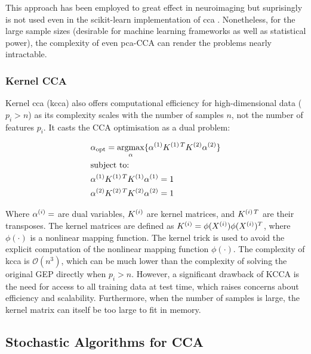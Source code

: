 This approach has been employed to great effect in neuroimaging but suprisingly is not used even in the scikit-learn implementation of \acrshort{cca} \citep{pedregosa2011scikit}.
Nonetheless, for the large sample sizes (desirable for machine learning frameworks as well as statistical power), the complexity of even \acrshort{pca}-CCA can render the problems nearly intractable.

\subsubsection{Kernel CCA}

Kernel \acrshort{cca} (\acrshort{kcca}) also offers computational efficiency for high-dimensional data (\(p_i>n\)) as its complexity scales with the number of samples \(n\), not the number of features \(p_i\)\citep{akaho2006kernel}.
It casts the CCA optimisation as a dual problem:

\begin{align}
    & \alpha_{\text{opt}}=\underset{\alpha}{\mathrm{argmax}}\{ \alpha^{(1)}K^{(1)\,T}K^{(2)}\alpha^{(2)}  \} \\
    & \text{subject to:} \notag                                                                                            \\
    & \alpha^{(1)}K^{(1)\,T}K^{(1)}\alpha^{(1)}=1 \notag                                                                  \\
    & \alpha^{(2)}K^{(2)\,T}K^{(2)}\alpha^{(2)}=1 \notag
\end{align}

Where \(\alpha^{(i)}=\) are dual variables, \(K^{(i)}\) are kernel matrices, and \(K^{(i)\,T}\) are their transposes.
The kernel matrices are defined as \(K^{(i)}=\phi(X^{(i)})\phi(X^{(i)})^T\), where \(\phi(\cdot)\) is a nonlinear mapping function.
The kernel trick is used to avoid the explicit computation of the nonlinear mapping function \(\phi(\cdot)\).
The complexity of \acrshort{kcca} is \(\mathcal{O}(n^3)\), which can be much lower than the complexity of solving the original GEP directly when \(p_i>n\).
However, a significant drawback of KCCA is the need for access to all training data at test time, which raises concerns about efficiency and scalability.
Furthermore, when the number of samples is large, the kernel matrix can itself be too large to fit in memory.

\subsection{Stochastic Algorithms for CCA}


